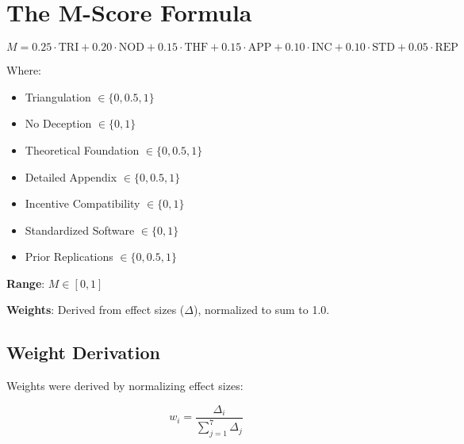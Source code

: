 \documentclass[11pt,a4paper]{article}
\begin{document}
\section{The M-Score Formula}
\label{sec:formula}

\begin{formulabox}[title={M-Score (Methodology Score)}]
\begin{equation}
\boxed{M = 0.25 \cdot \text{TRI} + 0.20 \cdot \text{NOD} + 0.15 \cdot \text{THF} + 0.15 \cdot \text{APP} + 0.10 \cdot \text{INC} + 0.10 \cdot \text{STD} + 0.05 \cdot \text{REP}}
\label{eq:mscore}
\end{equation}

\vspace{0.5em}
Where:
\begin{itemize}[leftmargin=2cm]
    \item[\textbf{TRI}] Triangulation $\in \{0, 0.5, 1\}$
    \item[\textbf{NOD}] No Deception $\in \{0, 1\}$
    \item[\textbf{THF}] Theoretical Foundation $\in \{0, 0.5, 1\}$
    \item[\textbf{APP}] Detailed Appendix $\in \{0, 0.5, 1\}$
    \item[\textbf{INC}] Incentive Compatibility $\in \{0, 1\}$
    \item[\textbf{STD}] Standardized Software $\in \{0, 1\}$
    \item[\textbf{REP}] Prior Replications $\in \{0, 0.5, 1\}$
\end{itemize}

\vspace{0.5em}
\textbf{Range}: $M \in [0, 1]$

\textbf{Weights}: Derived from effect sizes ($\Delta$), normalized to sum to 1.0.
\end{formulabox}

\subsection{Weight Derivation}

Weights were derived by normalizing effect sizes:

\begin{equation}
w_i = \frac{\Delta_i}{\sum_{j=1}^{7} \Delta_j}
\end{equation}
\end{document}
